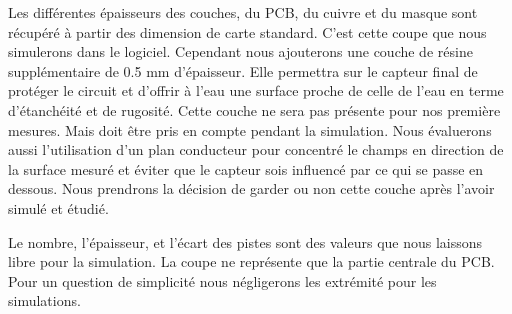 Les différentes épaisseurs des couches, du PCB, du cuivre et du masque sont récupéré à partir des dimension de carte standard. C'est cette coupe que nous simulerons dans le logiciel. Cependant nous ajouterons une couche de résine supplémentaire de 0.5 mm d'épaisseur. Elle permettra sur le capteur final de protéger le circuit et d'offrir à l'eau une surface proche de celle de l'eau en terme d'étanchéité et de rugosité. Cette couche ne sera pas présente pour nos première mesures. Mais doit être pris en compte pendant la simulation. Nous évaluerons aussi l'utilisation d'un plan conducteur pour concentré le champs en direction de la surface mesuré et éviter que le capteur sois influencé par ce qui se passe en dessous. Nous prendrons la décision de garder ou non cette couche après l'avoir simulé et étudié.

Le nombre, l'épaisseur, et l'écart des pistes sont des valeurs que nous laissons libre pour la simulation. La coupe ne représente que la partie centrale du PCB. Pour un question de simplicité nous négligerons les extrémité pour les simulations.

